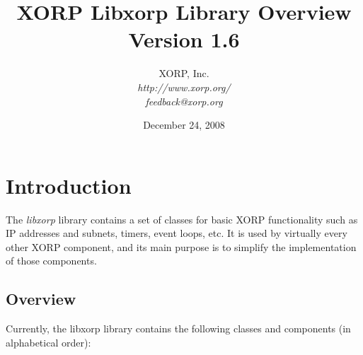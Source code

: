 \documentclass[11pt]{article}
\begin{document}
\title{XORP Libxorp Library Overview \\
\vspace{1ex}
Version 1.6}
\author{ XORP, Inc.					\\
         {\it http://www.xorp.org/}			\\
	 {\it feedback@xorp.org}
}
\date{December 24, 2008}

\maketitle


\section{Introduction}

The \emph{libxorp} library contains a set of classes for basic
XORP functionality such as IP addresses and subnets, timers, event
loops, etc. It is used by virtually every other XORP component, and
its main purpose is to simplify the implementation of those components.

\subsection{Overview}

Currently, the libxorp library contains the following classes and
components (in alphabetical order):
\end{document}
